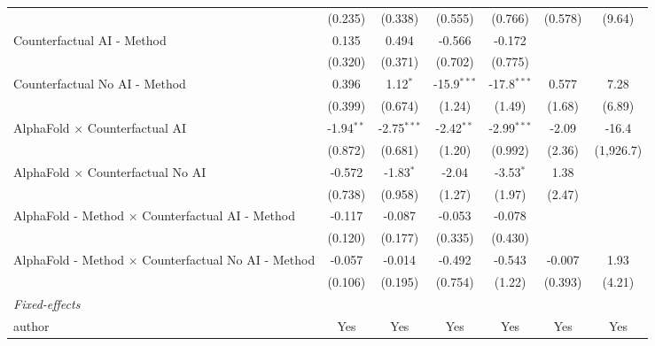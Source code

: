\begin{tabular}{lcccccc}
                                                              & (0.235)      & (0.338)       & (0.555)       & (0.766)       & (0.578)      & (9.64)\\   
   Counterfactual AI - Method                                 & 0.135        & 0.494         & -0.566        & -0.172        &              &   \\   
                                                              & (0.320)      & (0.371)       & (0.702)       & (0.775)       &              &   \\   
   Counterfactual No AI - Method                              & 0.396        & 1.12$^{*}$    & -15.9$^{***}$ & -17.8$^{***}$ & 0.577        & 7.28\\   
                                                              & (0.399)      & (0.674)       & (1.24)        & (1.49)        & (1.68)       & (6.89)\\   
   AlphaFold $\times$ Counterfactual AI                       & -1.94$^{**}$ & -2.75$^{***}$ & -2.42$^{**}$  & -2.99$^{***}$ & -2.09        & -16.4\\   
                                                              & (0.872)      & (0.681)       & (1.20)        & (0.992)       & (2.36)       & (1,926.7)\\   
   AlphaFold $\times$ Counterfactual No AI                    & -0.572       & -1.83$^{*}$   & -2.04         & -3.53$^{*}$   & 1.38         &   \\   
                                                              & (0.738)      & (0.958)       & (1.27)        & (1.97)        & (2.47)       &   \\   
   AlphaFold - Method $\times$ Counterfactual AI - Method     & -0.117       & -0.087        & -0.053        & -0.078        &              &   \\   
                                                              & (0.120)      & (0.177)       & (0.335)       & (0.430)       &              &   \\   
   AlphaFold - Method $\times$ Counterfactual No AI - Method  & -0.057       & -0.014        & -0.492        & -0.543        & -0.007       & 1.93\\   
                                                              & (0.106)      & (0.195)       & (0.754)       & (1.22)        & (0.393)      & (4.21)\\   
   \midrule
   \emph{Fixed-effects}\\
   author                                                     & Yes          & Yes           & Yes           & Yes           & Yes          & Yes\\  

\end{tabular}
